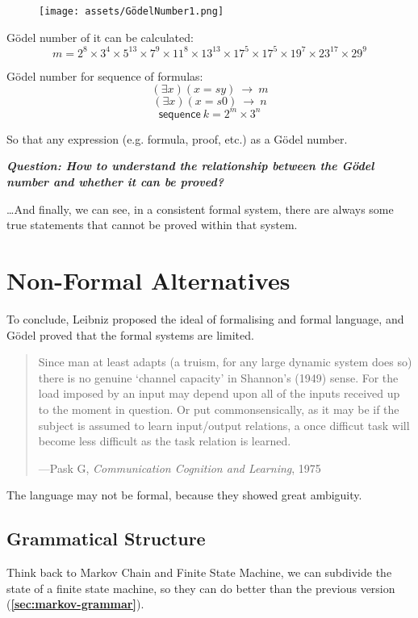 \documentclass[a4paper, openany]{book}
\begin{document}
\begin{figure}[htbp]
  \centering
  \texttt{[image: assets/GödelNumber1.png]}
\end{figure}

Gödel number of it can be calculated:
$$m = 2^8 \times 3^4 \times 5^{13} \times 7^9 \times 11^8 \times 13^{13} \times 17^5 \times 17^5 \times 19^7 \times 23^{17} \times 29^9$$

Gödel number for sequence of formulas:
$$( \exists x ) ( x = sy ) \  \rightarrow \  m$$
$$( \exists x ) ( x = s0 ) \  \rightarrow \  n$$
$$\mathsf{sequence} \  k = 2^m \times 3^n$$

So that any expression (e.g. formula, proof, etc.) as a Gödel number.

\textbf{\textit{Question: How to understand the relationship between the Gödel number and whether it can be proved?}}

\dots And finally, we can see, in a consistent formal system, there are always some true statements that cannot be proved within that system.

\section{Non-Formal Alternatives}

To conclude, Leibniz proposed the ideal of formalising and formal language, and Gödel proved that the formal systems are limited.

\begin{quotation}
  Since man at least adapts (a truism, for any large dynamic system does so) there is no genuine `channel capacity' in Shannon's (1949) sense. For the load imposed by an input may depend upon all of the inputs received up to the moment in question. Or put commonsensically, as it may be if the subject is assumed to learn input/output relations, a once difficut task will become less difficult as the task relation is learned.

  \hfill ---Pask G, \textit{Communication Cognition and Learning}, 1975
\end{quotation}

The language may not be formal, because they showed great ambiguity.

\subsection{Grammatical Structure}\label{sec:grammatic-structure}

Think back to Markov Chain and Finite State Machine, we can subdivide the state of a finite state machine, so they can do better than the previous version (\textbf{\cref{sec:markov-grammar}}).
\end{document}
